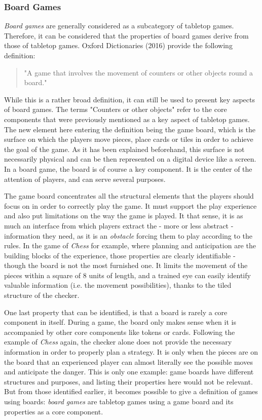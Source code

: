 \subsubsection{Board Games}
\textit{Board games} are generally considered as a subcategory of tabletop games. Therefore, it can be considered that the properties of board games derive from those of tabletop games. Oxford Dictionaries (2016)\cite{web:oxford} provide the following definition:
\begin{quotation}
"A game that involves the movement of counters or other objects round a board."
\end{quotation}
While this is a rather broad definition, it can still be used to present key aspects of board games. The terms "Counters or other objects" refer to the core components that were previously mentioned as a key aspect of tabletop games. The new element here entering the definition being the game board, which is the surface on which the players move pieces, place cards or tiles in order to achieve the goal of the game. As it has been explained beforehand, this surface is not necessarily physical and can be then represented on a digital device like a screen. In a board game, the board is of course a key component. It is the center of the attention of players, and can serve several purposes.

The game board concentrates all the structural elements that the players should focus on in order to correctly play the game. It must support the play experience and also put limitations on the way the game is played. It that sense, it is as much an interface from which players extract the - more or less abstract - information they need, as it is an \textit{obstacle} forcing them to play according to the rules. In the game of \textit{Chess} for example, where planning and anticipation are the building blocks of the experience, those properties are clearly identifiable - though the board is not the most furnished one. It limits the movement of the pieces within a square of 8 units of length, and a trained eye can easily identify valuable information (i.e. the movement possibilities), thanks to the tiled structure of the checker. 

One last property that can be identified, is that a board is rarely a core component in itself. During a game, the board only makes sense when it is accompanied by other core components like tokens or cards. Following the example of  \textit{Chess} again, the checker alone does not provide the necessary information in order to properly plan a strategy. It is only when the pieces are on the board that an experienced player can almost literally see the possible moves and anticipate the danger. This is only one example: game boards have different structures and purposes, and listing their properties here would not be relevant. But from those identified earlier, it becomes possible to give a definition of games using boards: \textit{board games} are tabletop games using a game board and its properties as a core component.
